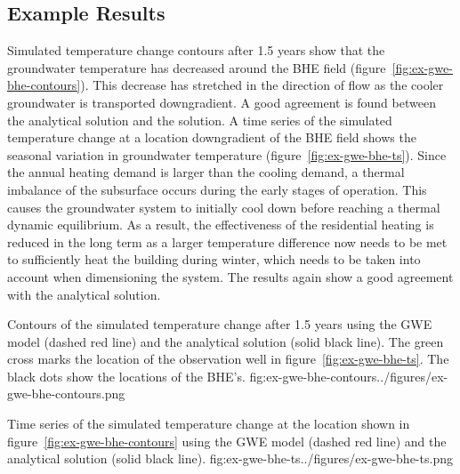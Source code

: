 \subsection{Example Results}

Simulated temperature change contours after 1.5 years show that the groundwater temperature has decreased around the BHE field (figure~\ref{fig:ex-gwe-bhe-contours}). This decrease has stretched in the direction of flow as the cooler groundwater is transported downgradient. A good agreement is found between the analytical solution and the \mf solution. A time series of the simulated temperature change at a location downgradient of the BHE field shows the seasonal variation in groundwater temperature (figure~\ref{fig:ex-gwe-bhe-ts}). Since the annual heating demand is larger than the cooling demand, a thermal imbalance of the subsurface occurs during the early stages of operation. This causes the groundwater system to initially cool down before reaching a thermal dynamic equilibrium. As a result, the effectiveness of the residential heating is reduced in the long term as a larger temperature difference now needs to be met to sufficiently heat the building during winter, which needs to be taken into account when dimensioning the system. The \mf results again show a good agreement with the analytical solution.

\begin{StandardFigure}{
    Contours of the simulated temperature change after 1.5 years using the \mf GWE model (dashed red line) and the analytical solution (solid black line). The green cross marks the location of the observation well in figure~\ref{fig:ex-gwe-bhe-ts}. The black dots show the locations of the BHE's.
    }{fig:ex-gwe-bhe-contours}{../figures/ex-gwe-bhe-contours.png}
\end{StandardFigure}                                 

\begin{StandardFigure}{
    Time series of the simulated temperature change at the location shown in figure~\ref{fig:ex-gwe-bhe-contours} using the \mf GWE model (dashed red line) and the analytical solution (solid black line). 
    }{fig:ex-gwe-bhe-ts}{../figures/ex-gwe-bhe-ts.png}
\end{StandardFigure}    
